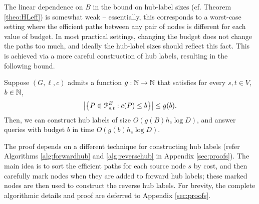 \label{sec:frontier}

The linear dependence on $B$ in the bound on hub-label sizes (cf. Theorem \ref{theo:HLeff}) is somewhat weak -- essentially, this corresponds to a worst-case setting where the efficient paths between any pair of nodes is different for each value of budget. In most practical settings, changing the budget does not change the paths too much, and ideally the hub-label sizes should reflect this fact. This is achieved via a more careful construction of hub labels, resulting in the following bound. 
\begin{theorem}
\label{thm:markedhubs}
Suppose $(G,\ell,c)$ admits a function $g:\N\to \N$ that satisfies for every $s,t\in V$, $b\in \N$,
\[
\abs*{\crl*{P\in\Pst^E: c(P)\leq b}} \leq g(b).
\]
Then, we can construct hub labels of size $O(g(B)h_c\log D)$, and answer queries with budget $b$ in time $O(g(b)h_c\log D)$.
\end{theorem}

The proof depends on a different technique for constructing hub labels (refer Algorithms \ref{alg:forwardhub} and \ref{alg:reversehub} in Appendix \ref{sec:proofs}). The main idea is to sort the efficient paths for each source node $s$ by cost, and then carefully mark nodes when they are added to forward hub labels; these marked nodes are then used to construct the reverse hub labels.
For brevity, the complete algorithmic details and proof are deferred to Appendix \ref{sec:proofs}.



